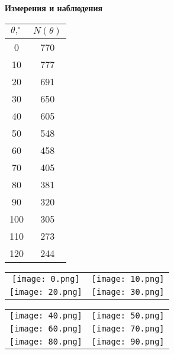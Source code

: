 \documentclass[12pt]{article}
\begin{document}
\begin{center}
    \textbf{Измерения и наблюдения}
\end{center}

\begin{center}
    \begin{tabular}{|c|c|}
      \hline
      $\theta, ^\circ$ & $N(\theta)$ \\
      \hline           
      0 & 770  \\
      \hline           
      10 & 777 \\
      \hline           
      20 & 691 \\
      \hline           
      30 & 650 \\
      \hline           
      40 & 605 \\
      \hline           
      50 & 548 \\
      \hline           
      60 & 458 \\
      \hline           
      70 & 405 \\
      \hline           
      80 & 381 \\
      \hline           
      90 & 320 \\
      \hline           
      100 & 305 \\
      \hline           
      110 & 273 \\
      \hline           
      120 & 244 \\
      \hline           
    \end{tabular}
\end{center}
\begin{center}
    \begin{tabular}{cc}
      \texttt{[image: 0.png]} & \texttt{[image: 10.png]} \\
      \texttt{[image: 20.png]} & \texttt{[image: 30.png]} \\
    \end{tabular}
\end{center}
\begin{center}
    \begin{tabular}{cc}
      \texttt{[image: 40.png]} & \texttt{[image: 50.png]} \\
      \texttt{[image: 60.png]} & \texttt{[image: 70.png]} \\
      \texttt{[image: 80.png]} & \texttt{[image: 90.png]} \\
    \end{tabular}
\end{center}
\end{document}
